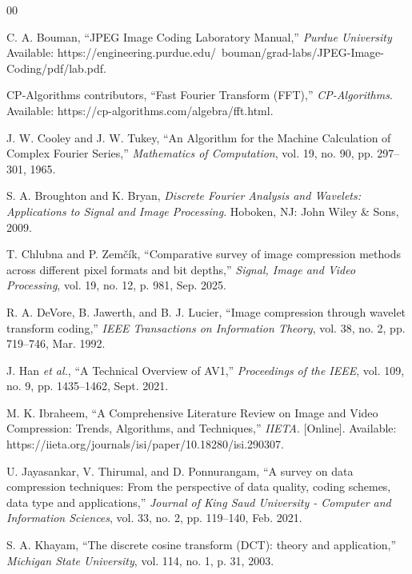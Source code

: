 \begin{thebibliography}{00}

C. A. Bouman, ``JPEG Image Coding Laboratory Manual,'' \emph{Purdue University} Available: https://engineering.purdue.edu/~bouman/grad-labs/JPEG-Image-Coding/pdf/lab.pdf.

CP-Algorithms contributors, ``Fast Fourier Transform (FFT),'' \emph{CP-Algorithms}. Available: https://cp-algorithms.com/algebra/fft.html.

J. W. Cooley and J. W. Tukey, ``An Algorithm for the Machine Calculation of Complex Fourier Series,'' \emph{Mathematics of Computation}, vol. 19, no. 90, pp. 297--301, 1965.

S. A. Broughton and K. Bryan, \emph{Discrete Fourier Analysis and Wavelets: Applications to Signal and Image Processing}. Hoboken, NJ: John Wiley \& Sons, 2009.

T. Chlubna and P. Zemčík, ``Comparative survey of image compression methods across different pixel formats and bit depths,'' \emph{Signal, Image and Video Processing}, vol. 19, no. 12, p. 981, Sep. 2025.

R. A. DeVore, B. Jawerth, and B. J. Lucier, ``Image compression through wavelet transform coding,'' \emph{IEEE Transactions on Information Theory}, vol. 38, no. 2, pp. 719--746, Mar. 1992.

J. Han \emph{et al.}, ``A Technical Overview of AV1,'' \emph{Proceedings of the IEEE}, vol. 109, no. 9, pp. 1435--1462, Sept. 2021.

M. K. Ibraheem, ``A Comprehensive Literature Review on Image and Video Compression: Trends, Algorithms, and Techniques,'' \emph{IIETA}. [Online]. Available: https://iieta.org/journals/isi/paper/10.18280/isi.290307.

U. Jayasankar, V. Thirumal, and D. Ponnurangam, ``A survey on data compression techniques: From the perspective of data quality, coding schemes, data type and applications,'' \emph{Journal of King Saud University - Computer and Information Sciences}, vol. 33, no. 2, pp. 119--140, Feb. 2021.

S. A. Khayam, ``The discrete cosine transform (DCT): theory and application,'' \emph{Michigan State University}, vol. 114, no. 1, p. 31, 2003.


\end{thebibliography}
